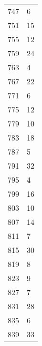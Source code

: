 \documentclass[11pt]{report}
\begin{document}
\begin{center}
\begin{tabular}{|ll|}
    747  & 6       \\
    751  & 15      \\
    755  & 12      \\
    759  & 24      \\
    763  & 4       \\
    767  & 22      \\
    771  & 6       \\
    775  & 12      \\
    779  & 10      \\
    783  & 18      \\
    787  & 5       \\
    791  & 32      \\
    795  & 4       \\
    799  & 16      \\
    803  & 10      \\
    807  & 14      \\
    811  & 7       \\
    815  & 30      \\
    819  & 8       \\
    823  & 9       \\
    827  & 7       \\
    831  & 28      \\
    835  & 6       \\
    839  & 33      \\\hline
  \end{tabular}
\end{center}
\end{document}
